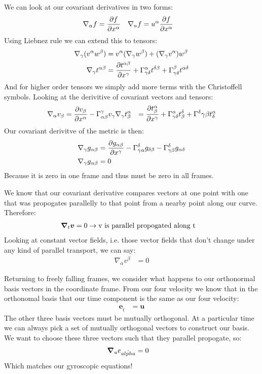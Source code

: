 We can look at our covariant derivatives in two forms:
\begin{align*}
	\nabla_\alpha f &= \frac{\partial f}{\partial x^\alpha} & \nabla_u f &= u^\alpha \frac{\partial f}{\partial x^\alpha}
\end{align*}
Using Liebnez rule we can extend this to tensors:
\begin{align*}
	\nabla_\gamma (v^\alpha w^\beta) &= v^\alpha(\nabla_\gamma w^\beta) + (\nabla_\gamma v^\alpha)w^\beta \\
	\nabla_\gamma t^{\alpha\beta} &= \frac{\partial t^{\alpha\beta}}{\partial x^\gamma} + \Gamma^\alpha_{\gamma\delta} t^{\delta\beta} + \Gamma^\beta_{\gamma\delta} t^{\alpha\delta}
\end{align*}
And for higher order tensors we simply add more terms with the Christoffell symbols. Looking at the derivitive of covariant vectors and tensors:
\begin{align*}
	\nabla_\alpha v_\beta &= \frac{\partial v_\beta}{\partial x^\alpha} - \Gamma^\gamma_{\alpha\beta} v_\gamma
	\nabla_\gamma t^\alpha_\beta &= \frac{\partial t^\alpha_\beta}{\partial x^\gamma} + \Gamma^\alpha_{\gamma\delta} t^\delta_\beta + \Gamma^\delta{\gamma\beta} t^\alpha_\delta
\end{align*}
Our covariant derivitve of the metric is then:
\begin{align*}
	\nabla_\gamma g_{\alpha\beta} &= \frac{\partial g_{\alpha\beta}}{\partial x^\gamma} - \Gamma^\delta_{\gamma\alpha} g_{\delta\beta} - \Gamma^\delta_{\gamma\beta} g_{\alpha\delta} \\
	\nabla_\gamma g_{\alpha\beta} &= 0
\end{align*}
Because it is zero in one frame and thus must be zero in all frames.

We know that our covariant derivative compares vectors at one point with one that was propogates parallelly to that point from a nearby point along our curve.
Therefore:
\begin{align*}
	\bm{\nabla}_t \bm{v} = 0  &\to \text{v is parallel propogated along t}
\end{align*}
Looking at constant vector fields, i.e. those vector fields that don't change under any kind of parallel transport, we can say:
\begin{align*}
	\nabla_\alpha v^\beta &= 0
\end{align*}

Returning to freely falling frames, we consider what happens to our orthonormal basis vectors in the coordinate frame. From our four velocity we know that in the orthonomal basis that our time component is the same as our four velocity:
\begin{align*}
	\bm{e}_{\hat{t}} &= \bm{u}
\end{align*}
The other three basis vectors must be mutually orthogonal. At a particular time we can always pick a set of mutually orthogonal vectors to construct our basis. We want to choose these three vectors such that they parallel propogate, so:
\begin{align*}
	\bm{\nabla}_u e_{\hat{alpha}} &= 0
\end{align*}
Which matches our gyroscopic equations!
